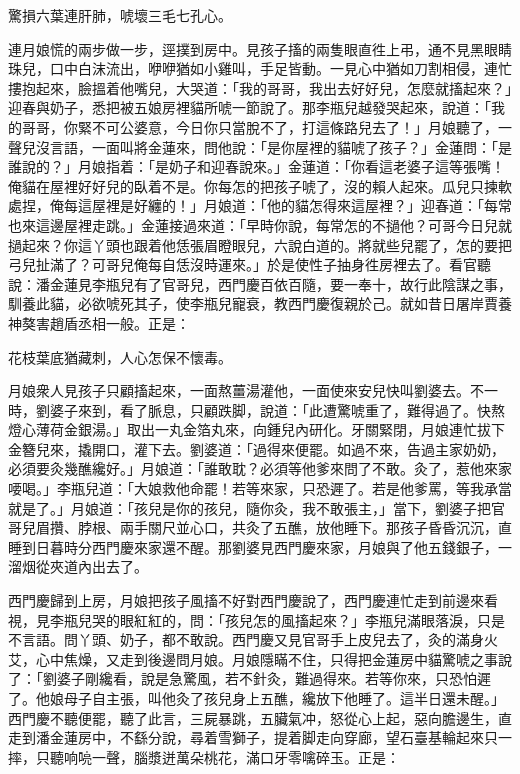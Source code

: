 \begin{myquote} 
驚損六葉連肝肺，唬壞三毛七孔心。
\end{myquote} 

連月娘慌的兩步做一步，逕撲到房中。見孩子搐的兩隻眼直徃上弔，通不見黑眼睛珠兒，口中白沫流出，咿咿猶如小雞叫，手足皆動。一見心中猶如刀割相侵，連忙摟抱起來，臉搵着他嘴兒，大哭道：「我的哥哥，我出去好好兒，怎麼就搐起來？」迎春與奶子，悉把被五娘房裡貓所唬一節說了。那李瓶兒越發哭起來，說道：「我的哥哥，你緊不可公婆意，今日你只當脫不了，打這條路兒去了！」{}月娘聽了，一聲兒沒言語，一面叫將金蓮來，問他說：{}「是你屋裡的貓唬了孩子？」金蓮問：「是誰說的？」月娘指着：「是奶子和迎春說來。」金蓮道：「你看這老婆子這等張嘴！俺貓在屋裡好好兒的臥着不是。你每怎的把孩子唬了，沒的賴人起來。瓜兒只揀軟處捏，俺每這屋裡是好纏的！」月娘道：「他的貓怎得來這屋裡？」迎春道：「每常也來這邊屋裡走跳。」金蓮接過來道：「早時你說，每常怎的不撾他？可哥今日兒就撾起來？你這丫頭也跟着他恁張眉瞪眼兒，六說白道的。將就些兒罷了，怎的要把弓兒扯滿了？可哥兒俺每自恁沒時運來。」{}於是使性子抽身徃房裡去了。看官聽說：潘金蓮見李瓶兒有了官哥兒，西門慶百依百隨，要一奉十，故行此陰謀之事，馴養此貓，必欲唬死其子，使李瓶兒寵衰，教西門慶復親於己。就如昔日屠岸賈養神獒害趙盾丞相一般。{}正是：

\begin{myquote} 
花枝葉底猶藏刺，人心怎保不懷毒。
\end{myquote} 

月娘衆人見孩子只顧搐起來，一面熬薑湯灌他，一面使來安兒快叫劉婆去。不一時，劉婆子來到，看了脈息，只顧跌脚，說道：「此遭驚唬重了，難得過了。快熬燈心薄荷金銀湯。」取出一丸金箔丸來，向鍾兒內研化。牙關緊閉，月娘連忙拔下金簪兒來，撬開口，灌下去。劉婆道：「過得來便罷。如過不來，告過主家奶奶，必須要灸幾醮纔好。」月娘道：「誰敢耽？必須等他爹來問了不敢。灸了，惹他來家喓喝。」李瓶兒道：「大娘救他命罷！若等來家，只恐遲了。若是他爹罵，等我承當就是了。」月娘道：「孩兒是你的孩兒，隨你灸，我不敢張主，」當下，劉婆子把官哥兒眉攢、脖根、兩手關尺並心口，共灸了五醮，放他睡下。那孩子昏昏沉沉，直睡到日暮時分西門慶來家還不醒。那劉婆見西門慶來家，月娘與了他五錢銀子，一溜烟從夾道內出去了。

西門慶歸到上房，月娘把孩子風搐不好對西門慶說了，西門慶連忙走到前邊來看視，見李瓶兒哭的眼紅紅的，問：「孩兒怎的風搐起來？」李瓶兒滿眼落淚，只是不言語。問丫頭、奶子，都不敢說。西門慶又見官哥手上皮兒去了，灸的滿身火艾，心中焦燥，又走到後邊問月娘。月娘隱瞞不住，只得把金蓮房中貓驚唬之事說了：「劉婆子剛纔看，說是急驚風，若不針灸，難過得來。若等你來，只恐怕遲了。他娘母子自主張，叫他灸了孩兒身上五醮，纔放下他睡了。這半日還未醒。」西門慶不聽便罷，聽了此言，三屍暴跳，五臟氣冲，怒從心上起，惡向膽邊生，直走到潘金蓮房中，不繇分說，尋着雪獅子，提着脚走向穿廊，望石臺基輪起來只一摔，只聽响喨一聲，腦漿迸萬朵桃花，滿口牙零噙碎玉。正是：

